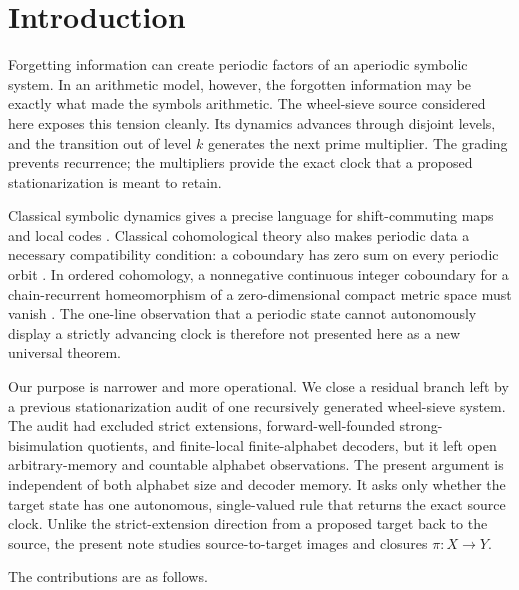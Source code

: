 \section{Introduction}
\label{sec:introduction}

Forgetting information can create periodic factors of an aperiodic symbolic
system.  In an arithmetic model, however, the forgotten information may be
exactly what made the symbols arithmetic.  The wheel-sieve source considered
here exposes this tension cleanly.  Its dynamics advances through disjoint
levels, and the transition out of level $k$ generates the next prime
multiplier.  The grading prevents recurrence; the multipliers provide the
exact clock that a proposed stationarization is meant to retain.

Classical symbolic dynamics gives a precise language for shift-commuting
maps and local codes \citep{hedlund1969,lindmarcus2021}.  Classical
cohomological theory also makes periodic data a necessary compatibility
condition: a coboundary has zero sum on every periodic orbit
\citep{livsic1972}.  In ordered cohomology, a nonnegative continuous integer
coboundary for a chain-recurrent homeomorphism of a zero-dimensional compact
metric space must vanish
\citep[Proposition~3.11]{boylehandelman1996}.  The one-line observation that
a periodic state cannot autonomously display a strictly advancing clock is
therefore not presented here as a new universal theorem.

Our purpose is narrower and more operational.  We close a residual branch
left by a previous stationarization audit of one recursively generated
wheel-sieve system.  The audit had excluded strict extensions,
forward-well-founded strong-bisimulation quotients, and finite-local
finite-alphabet decoders, but it left open arbitrary-memory and countable
alphabet observations.  The present argument is independent of both
alphabet size and decoder memory.  It asks only whether the target state has
one autonomous, single-valued rule that returns the exact source clock.
Unlike the strict-extension direction from a proposed target back to the
source, the present note studies source-to-target images and closures
$\pi:X\to Y$.

The contributions are as follows.

